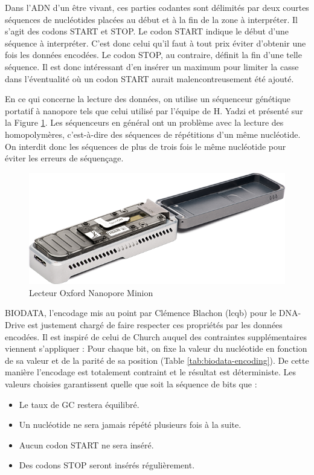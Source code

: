 \documentclass[a4paper]{report}
\begin{document}
Dans l'ADN d'un être vivant, ces parties codantes sont délimités par deux courtes séquences de nucléotides placées au début et à la fin de la zone à interpréter.
Il s'agit des codons START et STOP.
Le codon START indique le début d'une séquence à interpréter.
C'est donc celui qu'il faut à tout prix éviter d'obtenir une fois les données encodées.
Le codon STOP, au contraire, définit la fin d'une telle séquence.
Il est donc intéressant d'en insérer un maximum pour limiter la casse dans l'éventualité où un codon START aurait malencontreusement été ajouté.

En ce qui concerne la lecture des données, on utilise un séquenceur génétique portatif à
nanopore tels que celui utilisé par l’équipe de H. Yadzi \cite{yazdi2017portable} et présenté sur la Figure \ref{fig:oxford-nanopore-minion}.
Les séquenceurs en général ont un problème avec la lecture des homopolymères, c’est-à-dire des
séquences de répétitions d’un même nucléotide. On interdit donc les séquences de plus de trois fois
le même nucléotide pour éviter les erreurs de séquençage.

\begin{figure}[ht]
\centering
\includegraphics[width=.6\textwidth]{oxford-nanopore-minion}
\caption{Lecteur Oxford Nanopore Minion}
\label{fig:oxford-nanopore-minion}
\end{figure}

BIODATA, l'encodage mis au point par Clémence Blachon (\ac{lcqb}) pour le DNA-Drive est justement chargé de faire respecter ces propriétés par les données encodées.
Il est inspiré de celui de Church auquel des contraintes supplémentaires viennent s'appliquer :
Pour chaque bit, on fixe la valeur du nucléotide en fonction de sa valeur et de la parité de sa position (Table \ref{tab:biodata-encoding}).
De cette manière l'encodage est totalement contraint et le résultat est déterministe.
Les valeurs choisies garantissent quelle que soit la séquence de bits que :

\begin{itemize}
  \item Le taux de GC restera équilibré.
  \item Un nucléotide ne sera jamais répété plusieurs fois à la suite.
  \item Aucun codon START ne sera inséré.
  \item Des codons STOP seront insérés régulièrement.
\end{itemize}
\end{document}
